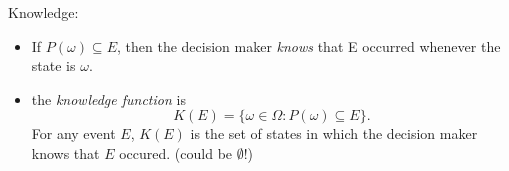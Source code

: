 \documentclass{beamer}    %
\newcommand{\Ra}{\Rightarrow}
\theoremstyle{plain}
\theoremstyle{definition}
\begin{document}
{Knowledge:
\begin{itemize}
\item If $P(\omega)\subseteq E$, then the decision maker \emph{knows}
  that E occurred whenever the state is $\omega$.
\item the \emph{knowledge function} is
  \begin{equation}
    \label{eq:knowledge_fct}
    K(E)=\{\omega\in\Omega: P(\omega)\subseteq E\}.
  \end{equation}
  For any event $E$, $K(E)$ is the set of states in which the decision maker knows that $E$ occured. (could be $\emptyset$!) 

\end{itemize}}
\end{document}
